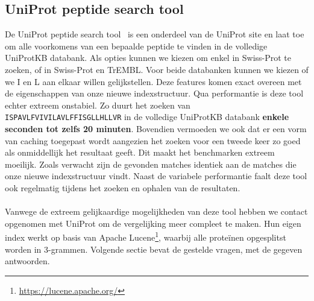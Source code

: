\subsection{UniProt peptide search tool}
De UniProt peptide search tool~\cite{uniprot_search_paper, uniprot_search_site} is een onderdeel van de UniProt site en laat toe om alle voorkomens van een bepaalde peptide te vinden in de volledige UniProtKB databank.
Als opties kunnen we kiezen om enkel in Swiss-Prot te zoeken, of in Swiss-Prot en TrEMBL\@.
Voor beide databanken kunnen we kiezen of we I en L aan elkaar willen gelijkstellen.
Deze features komen exact overeen met de eigenschappen van onze nieuwe indexstructuur.
Qua performantie is deze tool echter extreem onstabiel.
Zo duurt het zoeken van \texttt{ISPAVLFVIVILAVLFFISGLLHLLVR} in de volledige UniProtKB databank \textbf{enkele seconden tot zelfs 20 minuten}.
Bovendien vermoeden we ook dat er een vorm van caching toegepast wordt aangezien het zoeken voor een tweede keer zo goed als onmiddellijk het resultaat geeft.
Dit maakt het benchmarken extreem moeilijk.
Zoals verwacht zijn de gevonden matches identiek aan de matches die onze nieuwe indexstructuur vindt.
Naast de variabele performantie faalt deze tool ook regelmatig tijdens het zoeken en ophalen van de resultaten.
\\ \\
Vanwege de extreem gelijkaardige mogelijkheden van deze tool hebben we contact opgenomen met UniProt om de vergelijking meer compleet te maken.
Hun eigen index werkt op basis van Apache Lucene\footnote{\url{https://lucene.apache.org/}}, waarbij alle proteïnen opgesplitst worden in 3-grammen.
Volgende sectie bevat de gestelde vragen, met de gegeven antwoorden.

